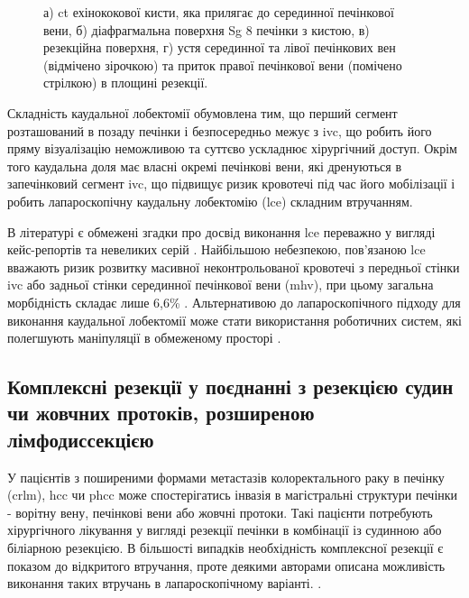 \begin{refsection}
\begin{figure}[h]
\medskip
\small
а) \acrshort{ct} ехінококової кисти, яка прилягає до  серединної печінкової вени, б) діафрагмальна поверхня Sg 8 печінки з кистою, в) резекційна поверхня, г) устя серединної та лівої печінкових вен (відмічено зірочкою) та приток правої печінкової вени (помічено стрілкою) в площині резекції.

\end{figure}





Складність каудальної лобектомії обумовлена тим, що перший сегмент розташований в позаду печінки і безпосередньо межує з \acrshort{ivc}, що робить його пряму візуалізацію неможливою та суттєво ускладнює хірургічний доступ. Окрім того каудальна доля має власні окремі печінкові вени, які дренуються в запечінковий сегмент \acrshort{ivc}, що підвищує ризик кровотечі під час його мобілізації і робить лапароскопічну каудальну лобектомію (\acrshort{lce}) складним втручанням. 
    
В літературі є обмежені згадки про досвід виконання \acrshort{lce} переважно у вигляді кейс-репортів та невеликих серій \cite{Machado2018, Cheung2016, Koh2017, Jin2018}. Найбільшою небезпекою, пов'язаною \acrshort{lce} вважають ризик розвитку масивної неконтрольованої кровотечі з передньої стінки \acrshort{ivc} або задньої стінки серединної печінкової вени (\acrshort{mhv}), при цьому загальна морбідність складає лише 6,6\% \cite{Araki2018}. Альтернативою до лапароскопічного підходу для виконання каудальної лобектомії може стати використання роботичних систем, які полегшують маніпуляції в обмеженому просторі \cite{Marino2018a}.

\subsection[Комплексні резекції]{Комплексні резекції у поєднанні з резекцією судин чи жовчних протоків, розширеною лімфодиссекцією}

У  пацієнтів з поширеними формами метастазів колоректального раку в печінку (\acrshort{crlm}), \acrshort{hcc} чи \acrshort{phcc}  може спостерігатись інвазія в магістральні структури печінки - ворітну вену, печінкові вени або жовчні протоки. Такі пацієнти потребують хірургічного лікування у вигляді резекції печінки в комбінації із судинною або біліарною резекцією. В більшості випадків необхідність комплексної резекції є показом до відкритого втручання, проте деякими авторами описана можливість виконання таких втручань в лапароскопічному варіанті. \cite{Kobayashi2015, Tardu2016, Procopio2020, Matsukuma2020}.


\end{refsection}
